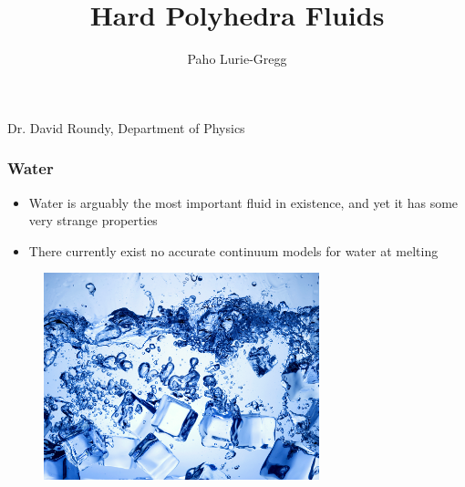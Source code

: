 \documentclass[handout]{beamer}
\title{Hard Polyhedra Fluids}
\author{Paho Lurie-Gregg}
\date{}
\begin{document}
{
\begin{frame}
  \maketitle
 \begin{center}
   Dr. David Roundy, Department of Physics
 \end{center}

\end{frame}
}
\begin{frame}
  \frametitle{Water}
  \begin{itemize}
  \item<1-> Water is arguably the most important fluid in existence, and yet it has some very strange properties
  \item<2-> There currently exist no accurate continuum models for water at melting
  \end{itemize}
  \begin{figure}[h]
    \includegraphics[width=80mm]{figs/ice-water.png}
  \end{figure}
\end{frame}
\end{document}
